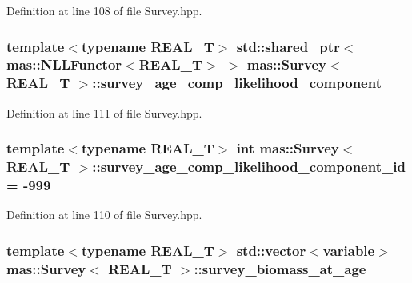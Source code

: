 Definition at line 108 of file Survey.\-hpp.

\hypertarget{structmas_1_1_survey_a913143ad9c3da583b3cad6f1a1ab109c}{
\subsubsection[{survey\-\_\-age\-\_\-comp\-\_\-likelihood\-\_\-component}]{\setlength{\rightskip}{0pt plus 5cm}template$<$typename R\-E\-A\-L\-\_\-\-T$>$ std\-::shared\-\_\-ptr$<${\bf mas\-::\-N\-L\-L\-Functor}$<$R\-E\-A\-L\-\_\-\-T$>$ $>$ {\bf mas\-::\-Survey}$<$ R\-E\-A\-L\-\_\-\-T $>$\-::survey\-\_\-age\-\_\-comp\-\_\-likelihood\-\_\-component}}\label{structmas_1_1_survey_a913143ad9c3da583b3cad6f1a1ab109c}


Definition at line 111 of file Survey.\-hpp.

\hypertarget{structmas_1_1_survey_ab091939f1b686d7dcbaf00ac9a2b507e}{
\subsubsection[{survey\-\_\-age\-\_\-comp\-\_\-likelihood\-\_\-component\-\_\-id}]{\setlength{\rightskip}{0pt plus 5cm}template$<$typename R\-E\-A\-L\-\_\-\-T$>$ int {\bf mas\-::\-Survey}$<$ R\-E\-A\-L\-\_\-\-T $>$\-::survey\-\_\-age\-\_\-comp\-\_\-likelihood\-\_\-component\-\_\-id = -\/999}}\label{structmas_1_1_survey_ab091939f1b686d7dcbaf00ac9a2b507e}


Definition at line 110 of file Survey.\-hpp.

\hypertarget{structmas_1_1_survey_a80b8b0dec9dfd6cf78ab807eaa1aa446}{
\subsubsection[{survey\-\_\-biomass\-\_\-at\-\_\-age}]{\setlength{\rightskip}{0pt plus 5cm}template$<$typename R\-E\-A\-L\-\_\-\-T$>$ std\-::vector$<${\bf variable}$>$ {\bf mas\-::\-Survey}$<$ R\-E\-A\-L\-\_\-\-T $>$\-::survey\-\_\-biomass\-\_\-at\-\_\-age}}\label{structmas_1_1_survey_a80b8b0dec9dfd6cf78ab807eaa1aa446}


